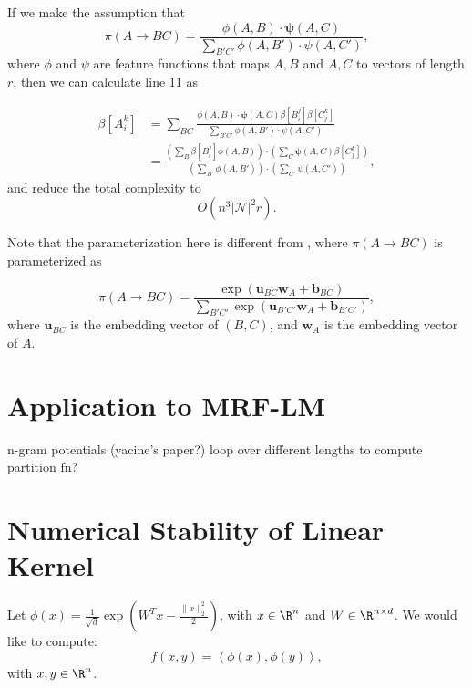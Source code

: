 \documentclass{article}
\begin{document}

If we make the assumption that
\begin{equation}
    \pi (A \to B C) = \frac{\phi(A, B) \cdot \mathbf{\psi}(A, C)}{\sum_{B'C'} \phi(A, B') \cdot \psi(A, C')},
\end{equation}
where $\phi$ and $\psi$ are feature functions that maps $A, B$ and $A, C$ to vectors of length $r$, then we can calculate line 11 as

\begin{align}
    \beta [A_{i}^k] & = \sum_{BC}\frac{\phi(A, B) \cdot \mathbf{\psi}(A, C) \beta[B_i^j] \beta[C_j^k]}{\sum_{B'C'} \phi(A, B') \cdot \psi(A, C')} \\
    &= \frac{(\sum_B \beta[B_i^j] \phi(A, B)) \cdot (\sum_C \mathbf{\psi}(A, C)  \beta[C_j^k])}{(\sum_{B'} \phi(A, B') )\cdot (\sum_{C'}\psi(A, C'))} ,
\end{align}
and reduce the total complexity to 
\begin{equation}
     O(n^3 |\mathcal{N}|^2 r).
\end{equation}

Note that the parameterization here is different from \cite{kim2019compound}, where $\pi (A \to B C)$ is parameterized as

\begin{equation}
    \pi (A \to B C) = \frac{\exp(\mathbf{u}_{BC} \mathbf{w}_A + \mathbf{b}_{BC})}{\sum_{B'C'} \exp(\mathbf{u}_{B'C'} \mathbf{w}_A + \mathbf{b}_{B'C'})},
\end{equation}
where $\mathbf{u}_{BC}$ is the embedding vector of $(B, C)$, and $\mathbf{w}_A$ is the embedding vector of $A$.

\section{Application to MRF-LM}
n-gram potentials (yacine's paper?)
loop over different lengths to compute partition fn?

\section{Numerical Stability of Linear Kernel}
Let $\phi(x) = \frac{1}{\sqrt{d}}\exp\left(W^Tx - \frac{\|x\|_2^2}{2}\right)$,
with $x \in \R^n$ and $W \in \R^{n\times d}$.
We would like to compute:
\begin{equation}
\label{eqn:rff-kernel}
f(x,y) = \left\langle
    \phi(x),\phi(y)
\right\rangle,
\end{equation}
with $x,y \in \R^n$.
\begin{comment}
The derivative is given by 
\begin{equation}
\frac{\partial f(x,y)}{\partial x} = \phi(y) \odot (W^T1 - x)
\end{equation}
\end{comment}




\end{document}
